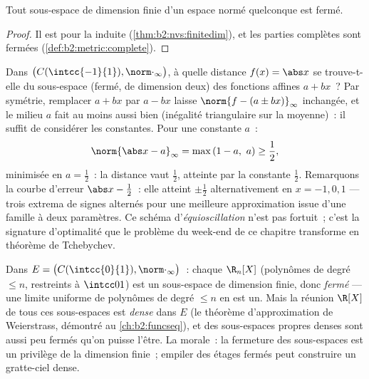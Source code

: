 \begin{corollary}\label{cor:b2:nvs:closedsubspace}
Tout sous-espace de dimension finie d'un espace normé quelconque est
fermé.
\end{corollary}

\begin{proof}
Il est  pour la  induite
(\cref{thm:b2:nvs:finitedim}), et les parties complètes sont fermées
(\cref{def:b2:metric:complete}).
\end{proof}

\begin{example}\label{ex:b2:nvs:bestaffine}
Dans $\bigl(C(\intcc{-1}{1}), \norm\cdot_\infty\bigr)$, à quelle
distance $f(x) = \abs x$ se trouve-t-elle du sous-espace (fermé, de
dimension deux) des fonctions affines $a + bx$~? Par symétrie,
remplacer $a + bx$ par $a - bx$ laisse $\norm{f - (a \pm bx)}_\infty$
inchangée, et le milieu $a$ fait au moins aussi bien (inégalité
triangulaire sur la moyenne)~: il suffit de considérer les constantes.
Pour une constante $a$~:
\[
\norm{\abs x - a}_\infty = \max\,(1 - a,\ a)
\geq \frac12 ,
\]
minimisée en $a = \frac12$~: la distance vaut $\frac12$, atteinte
par la constante $\frac12$. Remarquons la courbe d'erreur $\abs x -
\frac12$~: elle atteint $\pm\frac12$ alternativement en $x = -1, 0,
1$ --- trois extrema de signes alternés pour une meilleure
approximation issue d'une famille à deux paramètres. Ce schéma
d'\emph{équioscillation} n'est pas fortuit~; c'est la signature
d'optimalité que le problème du week-end de ce chapitre transforme en
théorème de Tchebychev.
\end{example}

\begin{example}\label{ex:b2:nvs:closeddense}
Dans $E = \bigl(C(\intcc{0}{1}), \norm\cdot_\infty\bigr)$~: chaque
$\R_n[X]$ (polynômes de degré $\leq n$, restreints à
$\intcc01$) est un sous-espace de dimension finie, donc \emph{fermé}
--- une limite uniforme de polynômes de degré $\leq n$ en est un. Mais
la réunion $\R[X]$ de tous ces sous-espaces est \emph{dense} dans $E$
(le théorème d'approximation de Weierstrass, démontré au
\cref{ch:b2:funcseq}), et des sous-espaces propres denses sont aussi
peu fermés qu'on puisse l'être. La morale~: la fermeture des
sous-espaces est un privilège de la dimension finie~; empiler des
étages fermés peut construire un gratte-ciel dense.
\end{example}

